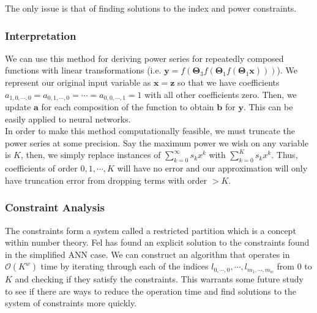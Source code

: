 The only issue is that of finding solutions to the index and power constraints.

\subsubsection{Interpretation}

We can use this method for deriving power series for repeatedly composed functions with linear transformations (i.e. $\mathbf{y} = f(\mathbf{\Theta}_3 f(\mathbf{
\Theta}_1 f(\mathbf{\Theta}_1 \mathbf{x})))$). We represent our original input variable as $\mathbf{x} = \mathbf{z}$ so that we have coefficients $a_{1, 0, \cdots, 0} = a_{0, 1, \cdots, 0} = \cdots = a_{0, 0, \cdots, 1} = 1$ with all other coefficients zero. Then, we update $\mathbf{a}$ for each composition of the function to obtain $\mathbf{b}$ for $\mathbf{y}$. This can be easily applied to neural networks.\\

In order to make this method computationally feasible, we must truncate the power series at some precision. Say the maximum power we wish on any variable is $K$, then, we simply replace instances of $\sum_{k=0}^{\infty} s_k x^k$ with $\sum_{k=0}^{K} s_k x^k$. Thus, coefficients of order $0, 1, \cdots, K$ will have no error and our approximation will only have truncation error from dropping terms with order $> K$.

\subsubsection{Constraint Analysis}

The constraints form a system called a restricted partition which is a concept within number theory. Fel has found an explicit solution to the constraints found in the simplified ANN case. We can construct an algorithm that operates in $\mathcal{O}(K^w)$ time by iterating through each of the indices $l_{0, \cdots, 0}, \cdots, l_{m_1, \cdots, m_w}$ from $0$ to $K$ and checking if they satisfy the constraints. This warrants some future study to see if there are ways to reduce the operation time and find solutions to the system of constraints more quickly.


